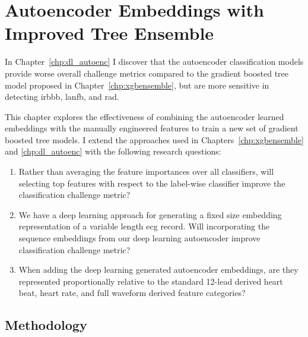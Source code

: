 \documentclass[\main/thesis.tex]{subfiles}
\begin{document}
\chapter{Autoencoder Embeddings with Improved Tree Ensemble}
\label{chp:aencxgb}

In Chapter~\ref{chp:dl_autoenc} I discover that the autoencoder classification models provide worse overall challenge metrics compared to the gradient boosted tree model proposed in Chapter~\ref{chp:xgbensemble}, but are more sensitive in detecting \gls{irbbb}, \gls{lanfb}, and \gls{rad}.

This chapter explores the effectiveness of combining the autoencoder learned embeddings with the manually engineered features to train a new set of gradient boosted tree models.
I extend the approaches used in Chapters~\ref{chp:xgbensemble} and \ref{chp:dl_autoenc} with the following research questions:
\begin{enumerate}
    \item \label{question:xgb_aenc_avg_vs_lab} Rather than averaging the feature importances over all classifiers, will selecting top features with respect to the label-wise classifier improve the classification challenge metric?
    \item \label{question:xgb_aenc_embd_vs_no_embd} We have a deep learning approach for generating a fixed size embedding representation of a variable length \gls{ecg} record. Will incorporating the sequence embeddings from our deep learning autoencoder improve classification challenge metric?
    \item \label{question:xgb_aenc_embd_ratio} When adding the deep learning generated autoencoder embeddings, are they represented proportionally relative to the standard 12-lead derived heart beat, heart rate, and full waveform derived feature categories?
\end{enumerate}

\section{Methodology}
\end{document}
